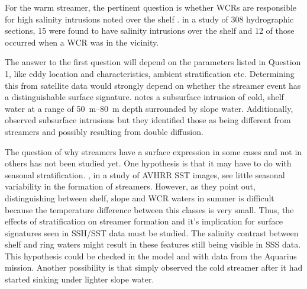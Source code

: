 
For the warm streamer, the pertinent question is whether WCRs are responsible for high salinity intrusions noted over the shelf \citep{Lentz2003}. \cite{Churchill1986} in a study of 308 hydrographic sections, 15 were found to have salinity intrusions over the shelf and 12 of those occurred when a WCR was in the vicinity. 


The answer to the first question will depend on the parameters listed in Question 1, like eddy location and characteristics, ambient stratification etc. Determining this from satellite data would strongly depend on whether the streamer event has a distinguishable surface signature. \cite{Churchill1986} notes a subsurface intrusion of cold, shelf water at a range of \SIrange{50}{80}{\m} depth surrounded by slope water. Additionally, \cite{Tang1985} observed subsurface intrusions but they identified those as being different from streamers and possibly resulting from double diffusion. 

The question of why streamers have a surface expression in some cases and not in others has not been studied yet. One hypothesis is that it may have to do with seasonal stratification. \cite{Garfield1987}, in a study of AVHRR SST images, see little seasonal variability in the formation of streamers. However, as they point out, distinguishing between shelf, slope and WCR waters in summer is difficult because the temperature difference between this classes is very small. Thus, the effects of stratification on streamer formation and it’s implication for surface signatures seen in SSH/SST data must be studied. The salinity contrast between shelf and ring waters might result in these features still being visible in SSS data. This hypothesis could be checked in the model and with data from the Aquarius mission. Another possibility is that \cite{Churchill1986} simply observed the cold streamer after it had started sinking under lighter slope water.

